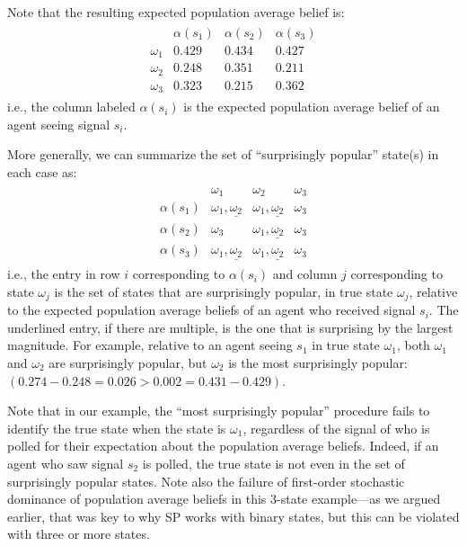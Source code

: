 \documentclass[12pt,reqno]{amsart}
\begin{document}
\begin{example}
Note that the resulting expected population average belief is:
\begin{align*}
     \begin{array}{c|ccc}
         & \alpha(s_1) & \alpha(s_2) & \alpha(s_3) \\\hline
        \omega_1  & 0.429 & 0.434 & 0.427 \\
        \omega_2 & 0.248 & 0.351 & 0.211 \\
        \omega_3 & 0.323 & 0.215 & 0.362
    \end{array}
 \end{align*}  
i.e., the column labeled $\alpha(s_i)$ is the expected population average belief of an agent seeing signal $s_i$.

More generally, we can summarize the set of ``surprisingly popular'' state(s) in each case as:
\begin{align*}
    \begin{array}{c|ccc}
         & \omega_1 & \omega_2 & \omega_3 \\\hline
        \alpha(s_1)  & \omega_1, \underline{\omega_2} & \omega_1, \underline{\omega_2} & \omega_3 \\
        \alpha(s_2) & \omega_3 & \omega_1, \underline{\omega_2} & \omega_3 \\
        \alpha(s_3) & \omega_1, \underline{\omega_2} & \omega_1, \underline{\omega_2} & \omega_3
    \end{array}
\end{align*}
i.e., the entry in row $i$ corresponding to $\alpha(s_i)$ and column $j$ corresponding to state $\omega_j$ is the set of states that are surprisingly popular, in true state $\omega_j$, relative to the expected population average beliefs of an agent who received signal $s_i$. The underlined entry, if there are multiple, is the one that is surprising by the largest magnitude. For example, relative to an agent seeing $s_1$ in true state $\omega_1$, both $\omega_1$ and $\omega_2$ are surprisingly popular, but $\omega_2$ is the most surprisingly popular: $(0.274 - 0.248 = 0.026 > 0.002 = 0.431 - 0.429)$.

Note that in our example, the ``most surprisingly popular'' procedure fails to identify the true state when the state is $\omega_1$, regardless of the signal of who is polled for their expectation about the population average beliefs. Indeed, if an agent who saw signal $s_2$ is polled, the true state is not even in the set of surprisingly popular states. Note also the failure of first-order stochastic dominance of population average beliefs in this 3-state example---as we argued earlier, that was key to why SP works with binary states, but this can be violated with three or more states. 


\end{example}
\end{document}
